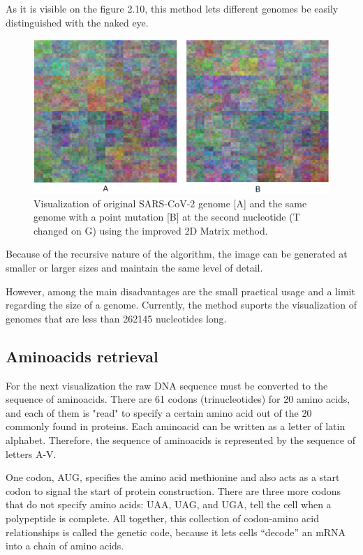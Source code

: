 As it is visible on the figure 2.10, this method lets different genomes be easily distinguished with the naked eye.

\begin{figure}[!ht]
	\centering
	\includegraphics[width=1\textwidth]{figures/2dim.png}
	\caption{Visualization of original SARS-CoV-2 genome [A] and the same genome with a point mutation [B] at the second nucleotide (T changed on G) using the improved 2D Matrix method.\label{o:latex_friendly_zone}}
\end{figure}

Because of the recursive nature of the algorithm, the image can be generated at smaller or larger sizes and maintain the same level of detail.

However, among the main disadvantages are the small practical usage and a limit regarding the size of a genome.
Currently, the method suports the visualization of genomes that are less than 262145 nucleotides long.

\subsection{Aminoacids retrieval}

For the next visualization the raw DNA sequence must be converted to the sequence of aminoacids.
There are 61 codons (trinucleotides) for 20 amino acids, and each of them is "read" to specify a certain amino acid out of the 20 commonly found in proteins.
Each aminoacid can be written as a letter of latin alphabet.
Therefore, the sequence of aminoacids is represented by the sequence of letters A-V. 

One codon, AUG, specifies the amino acid methionine and also acts as a start codon to signal the start of protein construction.
There are three more codons that do not specify amino acids: UAA, UAG, and UGA, tell the cell when a polypeptide is complete. 
All together, this collection of codon-amino acid relationships is called the genetic code, because it lets cells “decode” an mRNA into a chain of amino acids.

